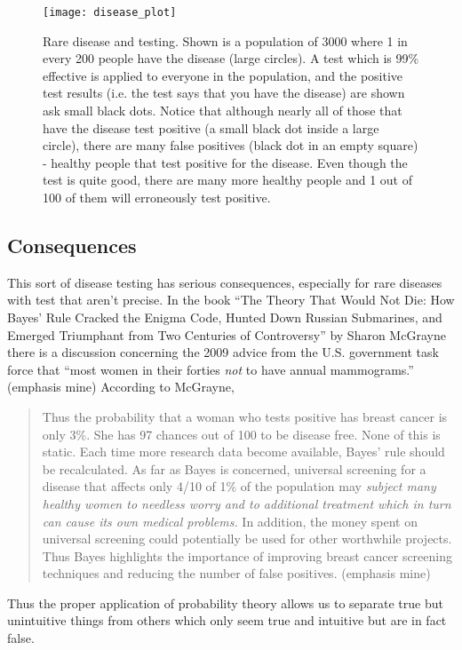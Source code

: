 \begin{figure*}
\texttt{[image: disease\_plot]}
\caption{Rare disease and testing.  Shown is a population of 3000 where 1 in every 200 people have the disease (large circles).  A test which is 99\% effective is applied to everyone in the population, and the positive test results (i.e. the test says that you have the disease) are shown ask small black dots. Notice that although nearly all of those that have the disease test positive (a small black dot inside a large circle), there are many false positives (black dot in an empty square) - healthy people that test positive for the disease.  Even though the test is quite good, there are many more healthy people and 1 out of 100 of them will erroneously test positive.}\label{fig:disease}
\end{figure*}

\subsection{Consequences}

This sort of disease testing has serious consequences, especially for rare diseases with test that aren't precise.  In the book ``The Theory That Would Not Die: How Bayes' Rule Cracked the Enigma Code, Hunted Down Russian Submarines, and Emerged Triumphant from Two Centuries of Controversy'' by Sharon McGrayne there is a discussion concerning the 2009 advice from the U.S. government task force that ``most women in their forties {\em not} to have annual mammograms.'' (emphasis mine)  According to McGrayne,
\begin{quotation}
Thus the probability that a woman who tests positive has breast cancer is only 3\%. She has 97 chances out of 100 to be disease free.
None of this is static. Each time more research data become available, Bayes' rule should be recalculated. As far as Bayes is concerned, universal screening for a disease that affects only 4/10 of 1\% of the population may {\em subject many healthy women to needless worry and to additional treatment which in turn can cause its own medical problems.} In addition, the money spent on universal screening could potentially be used for other worthwhile projects. Thus Bayes highlights the importance of improving breast cancer screening techniques and reducing the number of false positives.\cite{McGrayne:2011fk} (emphasis mine)
\end{quotation}

Thus the proper application of probability theory allows us to separate true but unintuitive things from others which only seem true and intuitive but are in fact false. 


